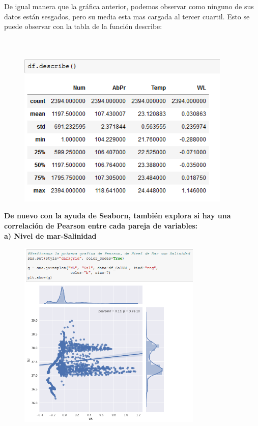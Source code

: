 \documentclass[12pt]{article}
\begin{document}
De igual manera que la gráfica anterior, podemos observar como ninguno de sus datos están sesgados, pero su media esta mas cargada al tercer cuartil. Esto se puede observar con la tabla de la función describe: \\ \\ \\

\begin{figure}[h]
    \centering
\includegraphics[width=4in]{dfdescribe.png}
\end{figure}

\noindent\textbf {De nuevo con la ayuda de Seaborn, también explora si hay una correlación de Pearson entre cada pareja de variables: } \\

\noindent\textbf {a) Nivel de mar-Salinidad} \\

\begin{figure}[h]
    \centering
\includegraphics[width=3.45in]{Pearson1.png}
\end{figure}
\end{document}
